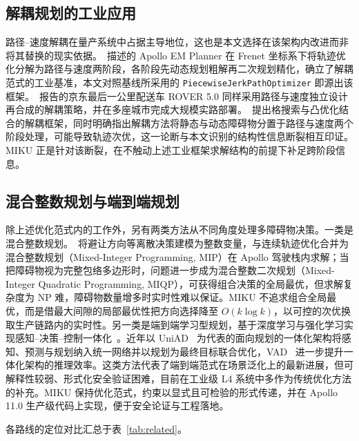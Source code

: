 \documentclass[a4paper,11pt]{ctexart}
\theoremstyle{definition}
\begin{document}
\subsection{解耦规划的工业应用}
\label{sec:related-industrial}

路径--速度解耦在量产系统中占据主导地位，这也是本文选择在该架构内改进而非将其替换的现实依据。\citet{fan2018baidu}~描述的 Apollo EM Planner 在 Frenet 坐标系下将轨迹优化分解为路径与速度两阶段，各阶段先动态规划粗解再二次规划精化，确立了解耦范式的工业基准，本文对照基线所采用的 \texttt{PiecewiseJerkPathOptimizer} 即源出该框架。\citet{wang2022_jfr}~报告的京东最后一公里配送车 ROVER 5.0 同样采用路径与速度独立设计再合成的解耦策略，并在多座城市完成大规模实路部署。\citet{meng2019_access}~提出格搜索与凸优化结合的解耦框架，同时明确指出解耦方法将静态与动态障碍物分置于路径与速度两个阶段处理，可能导致轨迹次优，这一论断与本文识别的结构性信息断裂相互印证。MIKU 正是针对该断裂，在不触动上述工业框架求解结构的前提下补足跨阶段信息。

\subsection{混合整数规划与端到端规划}
\label{sec:related-supplement}

除上述优化范式内的工作外，另有两类方法从不同角度处理多障碍物决策。一类是混合整数规划。\citet{kessler2023}~将避让方向等离散决策建模为整数变量，与连续轨迹优化合并为混合整数规划（Mixed-Integer Programming, MIP）在 Apollo 驾驶栈内求解；当把障碍物视为完整包络多边形时，问题进一步成为混合整数二次规划（Mixed-Integer Quadratic Programming, MIQP），可获得组合决策的全局最优，但求解复杂度为 NP 难，障碍物数量增多时实时性难以保证。MIKU 不追求组合全局最优，而是借最大间隙的局部最优性把方向选择降至 $O(k\log k)$，以可控的次优换取生产链路内的实时性。另一类是端到端学习型规划，基于深度学习与强化学习实现感知--决策--控制一体化~\citep{li2024decision,zhang2018autonomous}。近年以 UniAD~\citep{hu2023uniad} 为代表的面向规划的一体化架构将感知、预测与规划纳入统一网络并以规划为最终目标联合优化，VAD~\citep{jiang2023vad} 进一步提升一体化架构的推理效率。这类方法代表了端到端范式在场景泛化上的最新进展，但可解释性较弱、形式化安全验证困难，目前在工业级 L4 系统中多作为传统优化方法的补充。MIKU 保持优化范式，约束以显式且可检验的形式传递，并在 Apollo 11.0 生产级代码上实现，便于安全论证与工程落地。

各路线的定位对比汇总于表~\ref{tab:related}。
\end{document}
